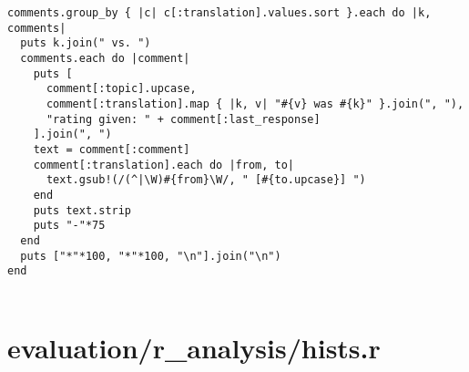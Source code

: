 \documentclass{article}
\begin{document}
\begin{verbatim}
comments.group_by { |c| c[:translation].values.sort }.each do |k, comments|
  puts k.join(" vs. ")
  comments.each do |comment|
    puts [
      comment[:topic].upcase,
      comment[:translation].map { |k, v| "#{v} was #{k}" }.join(", "),
      "rating given: " + comment[:last_response]
    ].join(", ")
    text = comment[:comment]
    comment[:translation].each do |from, to|
      text.gsub!(/(^|\W)#{from}\W/, " [#{to.upcase}] ")
    end
    puts text.strip
    puts "-"*75
  end
  puts ["*"*100, "*"*100, "\n"].join("\n")
end


\end{verbatim}
\pagebreak

\section*{evaluation/r\_analysis/hists.r}
\end{document}
